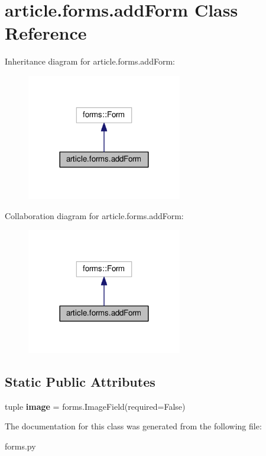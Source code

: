 \hypertarget{classarticle_1_1forms_1_1addForm}{}\section{article.\+forms.\+add\+Form Class Reference}
\label{classarticle_1_1forms_1_1addForm}


Inheritance diagram for article.\+forms.\+add\+Form\+:
\nopagebreak
\begin{figure}[H]
\begin{center}
\leavevmode
\includegraphics[width=192pt]{classarticle_1_1forms_1_1addForm__inherit__graph}
\end{center}
\end{figure}


Collaboration diagram for article.\+forms.\+add\+Form\+:
\nopagebreak
\begin{figure}[H]
\begin{center}
\leavevmode
\includegraphics[width=192pt]{classarticle_1_1forms_1_1addForm__coll__graph}
\end{center}
\end{figure}
\subsection*{Static Public Attributes}
\begin{DoxyCompactItemize}
\item 
\hypertarget{classarticle_1_1forms_1_1addForm_a1c672c58060e116ecdc354974c0048cf}{}tuple {\bfseries image} = forms.\+Image\+Field(required=False)\label{classarticle_1_1forms_1_1addForm_a1c672c58060e116ecdc354974c0048cf}

\end{DoxyCompactItemize}


The documentation for this class was generated from the following file\+:\begin{DoxyCompactItemize}
\item 
forms.\+py\end{DoxyCompactItemize}

